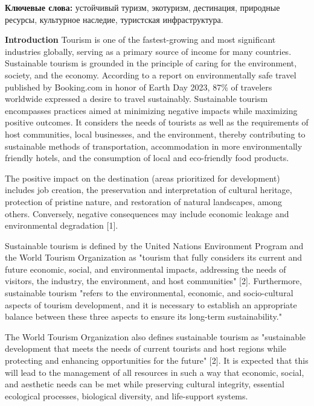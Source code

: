 {\bfseries Ключевые слова:} устойчивый туризм, экотуризм, дестинация,
природные ресурсы, культурное наследие, туристская инфраструктура.

\begin{multicols}{2}
{\bfseries Introduction} Tourism is one of the fastest-growing and most
significant industries globally, serving as a primary source of income
for many countries. Sustainable tourism is grounded in the principle of
caring for the environment, society, and the economy. According to a
report on environmentally safe travel published by Booking.com in honor
of Earth Day 2023, 87\% of travelers worldwide expressed a desire to
travel sustainably. Sustainable tourism encompasses practices aimed at
minimizing negative impacts while maximizing positive outcomes. It
considers the needs of tourists as well as the requirements of host
communities, local businesses, and the environment, thereby contributing
to sustainable methods of transportation, accommodation in more
environmentally friendly hotels, and the consumption of local and
eco-friendly food products.

The positive impact on the destination (areas prioritized for
development) includes job creation, the preservation and interpretation
of cultural heritage, protection of pristine nature, and restoration of
natural landscapes, among others. Conversely, negative consequences may
include economic leakage and environmental degradation {[}1{]}.

Sustainable tourism is defined by the United Nations Environment Program
and the World Tourism Organization as "tourism that fully considers its
current and future economic, social, and environmental impacts,
addressing the needs of visitors, the industry, the environment, and
host communities" {[}2{]}. Furthermore, sustainable tourism "refers to
the environmental, economic, and socio-cultural aspects of tourism
development, and it is necessary to establish an appropriate balance
between these three aspects to ensure its long-term sustainability."

The World Tourism Organization also defines sustainable tourism as
"sustainable development that meets the needs of current tourists and
host regions while protecting and enhancing opportunities for the
future" {[}2{]}. It is expected that this will lead to the management of
all resources in such a way that economic, social, and aesthetic needs
can be met while preserving cultural integrity, essential ecological
processes, biological diversity, and life-support systems.


\end{multicols}
